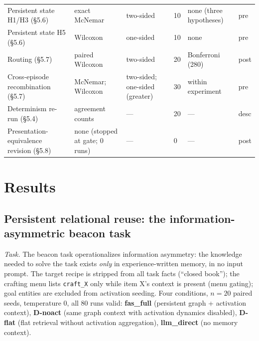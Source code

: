 \documentclass[10pt]{article}
\begin{document}
\begin{table}[t]
\begin{tabular}{L{3.0cm}L{3.4cm}L{2.2cm}L{1.1cm}L{2.2cm}L{0.9cm}}
Persistent state H1/H3 (\S5.6) & exact McNemar & two-sided & 10 & none (three hypotheses) & pre \\
Persistent state H5 (\S5.6) & Wilcoxon & one-sided & 10 & none & pre \\
Routing (\S5.7) & paired Wilcoxon & two-sided & 20 & Bonferroni (280) & post \\
Cross-episode recombination (\S5.7) & McNemar; Wilcoxon & two-sided; one-sided (greater) & 30 & within experiment & pre \\
Determinism re-run (\S5.4) & agreement counts & --- & 20 & --- & desc \\
Presentation-equivalence revision (\S5.8) & none (stopped at gate; 0 runs) & --- & 0 & --- & post \\
\bottomrule
\end{tabular}
\end{table}

\section{Results}
\label{sec:results}

\subsection{Persistent relational reuse: the information-asymmetric beacon task}
\label{sec:res-reuse}

\emph{Task.} The beacon task operationalizes information asymmetry: the knowledge needed to solve the task exists \emph{only} in experience-written memory, in no input prompt. The target recipe is stripped from all task facts (``closed book''); the crafting menu lists \texttt{craft\_X} only while item X's context is present (menu gating); goal entities are excluded from activation seeding. Four conditions, $n{=}20$ paired seeds, temperature 0, all 80 runs valid: \textbf{fas\_full} (persistent graph + activation context), \textbf{D-noact} (same graph context with activation dynamics disabled), \textbf{D-flat} (flat retrieval without activation aggregation), \textbf{llm\_direct} (no memory context).
\end{document}
